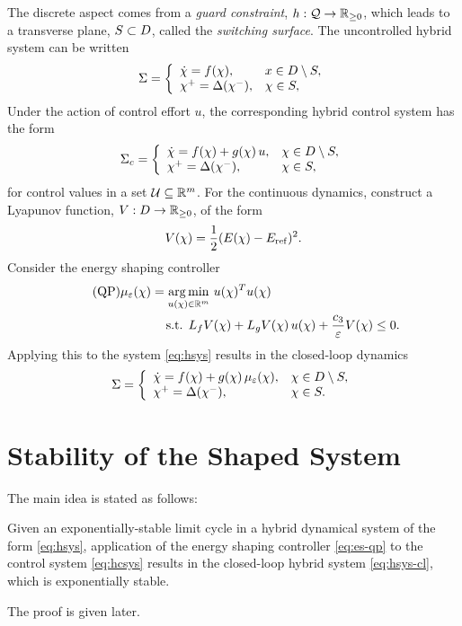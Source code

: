 \documentclass[twocolumn]{article}
\begin{document}
The discrete aspect comes from a {\em guard constraint}, $h : \mathcal{Q} \to \mathbb{R}_{\geq 0}$, which leads to a transverse plane, $S \subset D$, called the {\em switching surface}.
%
The uncontrolled hybrid system can be written
\begin{align}
  \Sigma = \left\{
  \begin{array}{l l}
    {\dot {\chi}} = f(\chi), & x \in D \setminus S,\\
    \chi^{+} = \Delta(\chi^{-}), &\chi \in S,
  \end{array}\right.
  \label{eq:hsys}
\end{align}
Under the action of control effort $u$, the corresponding hybrid control system has the form
\begin{align}
  \Sigma_{c} = \left\{
  \begin{array}{l l}
    {\dot {\chi}} = f(\chi) + g(\chi) \, u, & \chi \in D \setminus S,\\
    \chi^{+} = \Delta(\chi^{-}), & \chi \in S,
  \end{array}\right.
  \label{eq:hcsys}
\end{align}
for control values in a set $\mathcal{U} \subseteq \mathbb{R}^{m}$.
%
For the continuous dynamics, construct a Lyapunov function, $V : D \to \mathbb{R}_{\geq 0}$, of the form
\begin{align}
  \label{eq:lyap}
  V(\chi) = \frac{1}{2} (E(\chi) - E_{\mathrm{ref}})^2.
\end{align}
Consider the energy shaping controller
\begin{align}
  \label{eq:es-qp} \tag {QP}
  \mu_{\varepsilon}(\chi) = \operatorname*{arg\,min}_{u(\chi) \in \mathbb{R}^{m}} \ & u(\chi)^T u(\chi)\\
  \nonumber
  \mbox{s.t. } L_{f} V&(\chi) + L_{g} V(\chi) \, u(\chi) + \frac{c_{3}}{\varepsilon} V(\chi) \leq 0.
\end{align}
Applying this to the system \eqref{eq:hsys} results in the closed-loop dynamics
\begin{align}
  \label{eq:hsys-cl}
  \Sigma = \left\{
  \begin{array}{l l}
    {\dot {\chi}} = f(\chi) + g(\chi) \, \mu_{\varepsilon}(\chi), & \chi \in D \setminus S,\\
    \chi^{+} = \Delta(\chi^{-}), &\chi \in S.
  \end{array}\right.
\end{align}

\section{Stability of the Shaped System}

The main idea is stated as follows:
%
\begin{theorem}
  \label{theorem:main-theorem}
  Given an exponentially-stable limit cycle in a hybrid dynamical system of the form \eqref{eq:hsys}, application of the energy shaping controller \eqref{eq:es-qp} to the control system \eqref{eq:hcsys} results in the closed-loop hybrid system \eqref{eq:hsys-cl}, which is exponentially stable.
\end{theorem}
%
The proof is given later.
\end{document}
